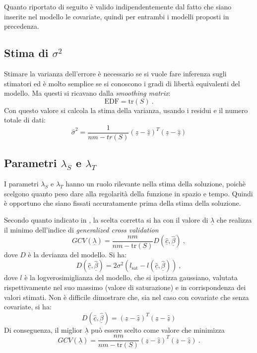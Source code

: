 \documentclass[a4paper,11pt,twoside,openright]{book}							%
\begin{document}
Quanto riportato di seguito è valido indipendentemente dal fatto che siano inserite nel modello le covariate, quindi per entrambi i modelli proposti in precedenza.

\subsection{Stima di $\sigma^2$}
Stimare la varianza dell'errore è necessario se si vuole fare inferenza sugli stimatori ed è molto semplice se si conoscono i gradi di libertà equivalenti del modello. Ma questi si ricavano dalla \textit{smoothing matrix}:
$$
\mathrm{EDF}=\mathrm{tr}(S) \ .
$$
Con questo valore si calcola la stima della varianza, usando i residui e il numero totale di dati:
$$
\hat{\sigma}^2=\frac{1}{nm-tr(S)}(\underline z - \hat  {\underline z})^T(\underline z - \hat  {\underline z})
$$

\subsection{Parametri $\lambda_S$ e $\lambda_T$}
I parametri $\lambda_S$ e $\lambda_T$ hanno un ruolo rilevante nella stima della soluzione, poichè scelgono quanto peso dare alla regolarità della funzione in spazio e tempo. Quindi è opportuno che siano fissati accuratamente prima della stima della soluzione.

Secondo quanto indicato in \cite{art:marra}, la scelta corretta si ha con il valore di $\underline \lambda$ che realizza il minimo dell'indice di \textit{generalized cross validation}
$$
GCV(\underline \lambda) =\frac{nm}{nm-\text{tr}(S)}  D(\hat  {\underline c},\hat  {\underline \beta}) \ ,
$$
dove $D$ è la devianza del modello. Si ha:
$$
D(\hat  {\underline c},\hat  {\underline \beta})=2\sigma^2(l_{\mathrm{sat}}-l(\hat  {\underline c},\hat  {\underline \beta})) \ ,
$$
dove $l$ è la logverosimiglianza del modello, che si ipotizza gaussiano, valutata rispettivamente nel suo massimo (valore di saturazione) e in corrispondenza dei valori stimati. Non è difficile dimostrare che, sia nel caso con covariate che senza covariate, si ha: 
$$
D(\hat  {\underline c},\hat  {\underline \beta}) = (\underline z - \hat  {\underline z})^T(\underline z - \hat  {\underline z})
$$
Di conseguenza, il miglior $\underline \lambda$ può essere scelto come valore che minimizza
\begin{equation}
\label{eq:GCV}
GCV(\underline \lambda) =\frac{nm}{nm-\text{tr}(S)}  (\underline z - \hat  {\underline z})^T(\underline z - \hat  {\underline z}) \ .
\end{equation}
\end{document}
